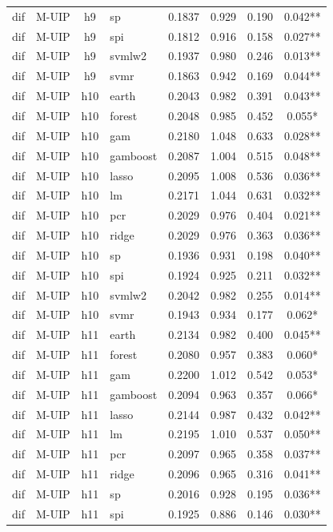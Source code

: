 \begin{ThreePartTable}
\begin{longtable}[t]{llclcccc}
dif & M-UIP & h9 & sp & 0.1837 & 0.929 & 0.190 & 0.042**\\
dif & M-UIP & h9 & spi & 0.1812 & 0.916 & 0.158 & 0.027**\\
dif & M-UIP & h9 & svmlw2 & 0.1937 & 0.980 & 0.246 & 0.013**\\
dif & M-UIP & h9 & svmr & 0.1863 & 0.942 & 0.169 & 0.044**\\
\addlinespace
dif & M-UIP & h10 & earth & 0.2043 & 0.982 & 0.391 & 0.043**\\
dif & M-UIP & h10 & forest & 0.2048 & 0.985 & 0.452 & 0.055*\\
dif & M-UIP & h10 & gam & 0.2180 & 1.048 & 0.633 & 0.028**\\
dif & M-UIP & h10 & gamboost & 0.2087 & 1.004 & 0.515 & 0.048**\\
dif & M-UIP & h10 & lasso & 0.2095 & 1.008 & 0.536 & 0.036**\\
dif & M-UIP & h10 & lm & 0.2171 & 1.044 & 0.631 & 0.032**\\
dif & M-UIP & h10 & pcr & 0.2029 & 0.976 & 0.404 & 0.021**\\
dif & M-UIP & h10 & ridge & 0.2029 & 0.976 & 0.363 & 0.036**\\
dif & M-UIP & h10 & sp & 0.1936 & 0.931 & 0.198 & 0.040**\\
dif & M-UIP & h10 & spi & 0.1924 & 0.925 & 0.211 & 0.032**\\
dif & M-UIP & h10 & svmlw2 & 0.2042 & 0.982 & 0.255 & 0.014**\\
dif & M-UIP & h10 & svmr & 0.1943 & 0.934 & 0.177 & 0.062*\\
\addlinespace
dif & M-UIP & h11 & earth & 0.2134 & 0.982 & 0.400 & 0.045**\\
dif & M-UIP & h11 & forest & 0.2080 & 0.957 & 0.383 & 0.060*\\
dif & M-UIP & h11 & gam & 0.2200 & 1.012 & 0.542 & 0.053*\\
dif & M-UIP & h11 & gamboost & 0.2094 & 0.963 & 0.357 & 0.066*\\
dif & M-UIP & h11 & lasso & 0.2144 & 0.987 & 0.432 & 0.042**\\
dif & M-UIP & h11 & lm & 0.2195 & 1.010 & 0.537 & 0.050**\\
dif & M-UIP & h11 & pcr & 0.2097 & 0.965 & 0.358 & 0.037**\\
dif & M-UIP & h11 & ridge & 0.2096 & 0.965 & 0.316 & 0.041**\\
dif & M-UIP & h11 & sp & 0.2016 & 0.928 & 0.195 & 0.036**\\
dif & M-UIP & h11 & spi & 0.1925 & 0.886 & 0.146 & 0.030**\\

\end{longtable}
\end{ThreePartTable}
